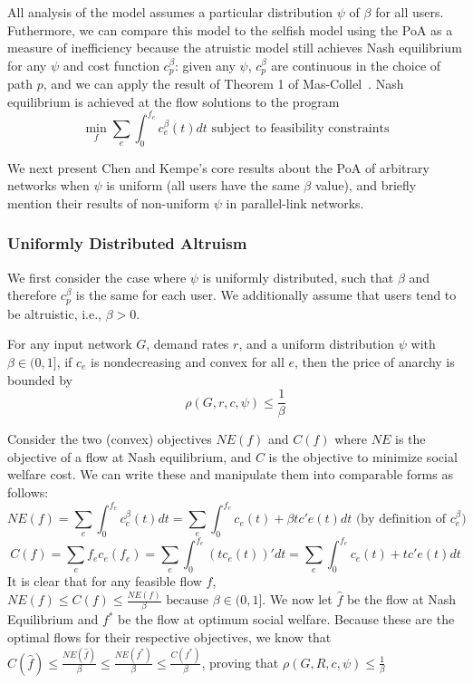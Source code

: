 All analysis of the model assumes a particular distribution $\psi$ of $\beta$ for all users. 
Futhermore, we can compare this model to the selfish model using the PoA as a measure of inefficiency
because the atruistic model still achieves Nash equilibrium for any $\psi$ and cost function $c^\beta_p$: given any $\psi$, $c^\beta_p$ are continuous in the choice of path $p$, and we can apply the result of Theorem 1 of Mas-Collel~\cite{mascollel}. Nash equilibrium is achieved at the flow solutions to the program
$$\min_f\sum_e\int_0^{f_e}c_e^\beta(t)dt \text{ subject to feasibility constraints}$$

We next present Chen and Kempe's core results about the PoA of arbitrary networks when $\psi$ is uniform (all users have the same $\beta$ value), and briefly mention their results of non-uniform $\psi$ in parallel-link networks.

\subsubsection{Uniformly Distributed Altruism}
We first consider the case where $\psi$ is uniformly distributed, such that $\beta$ and therefore $c^\beta_p$ is the same for each user. We additionally assume that users tend to be altruistic, i.e., $\beta > 0$.
\begin{theorem}
For any input network $G$, demand rates $r$, and 
a uniform distribution $\psi$ with $\beta \in (0, 1]$,
if $c_e$ is nondecreasing and convex for all $e$,
    then the price of anarchy is bounded by 
    $$\rho(G,r,c,\psi) \le \frac{1}{\beta}$$
\end{theorem}

\begin{proof-sketch}
    Consider the two (convex) objectives $NE(f)$ and $C(f)$ where $NE$ is the objective of a flow at Nash equilibrium, and $C$ is the objective to minimize social welfare cost. We can write these and manipulate them into comparable forms as follows:
    $$NE({f}) = \sum_e\int_0^{{f}_e}c_e^\beta(t)dt = 
        \sum_e\int_0^{{f}_e} c_e(t) + \beta tc'e(t)dt\text{ (by definition of $c^\beta_e$)}$$
    $$C(f) = \sum_ef_ec_e(f_e) = \sum_e\int_0^{f_e} (tc_e(t))' dt 
        = \sum_e\int_0^{f_e} c_e(t) + tc'e(t)dt$$ 
    It is clear that for any feasible flow $f$, 
    $NE(f) \le C(f) \le \frac{NE(f)}{\beta} \text{ because $\beta\in(0,1]$}$.
    We now let $\hat{f}$ be the flow at Nash Equilibrium and $f^*$ be the flow at optimum social welfare. Because these are the optimal flows for their respective objectives, we know that 
    $C(\hat{f}) \le \frac{NE(\hat{f})}{\beta} \le \frac{NE(f^*)}{\beta} \le \frac{C(f^*)}{\beta}$,
    proving that 
    $\rho(G,R,c,\psi) \le \frac{1}{\beta}$
\end{proof-sketch}


